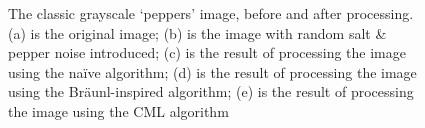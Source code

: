 \begin{figure}
\caption{\label{fig:peppers}The classic grayscale `peppers' image, before and after processing.  (a) is the original image; (b) is the image with random salt \& pepper noise introduced; (c) is the result of processing the image using the na\"{i}ve algorithm; (d) is the result of processing the image using the Br\"{a}unl-inspired algorithm; (e) is the result of processing the image using the CML algorithm}
\end{figure}

